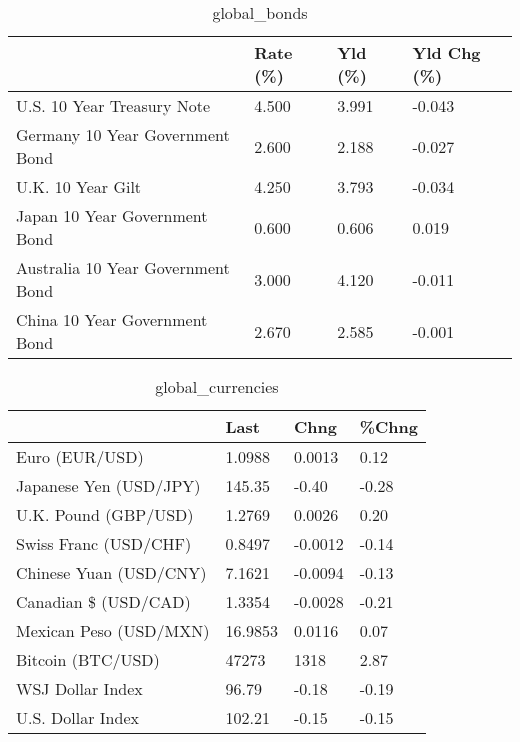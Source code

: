 \documentclass{article}%
\begin{document}
%


\begin{table}[htbp]%
\caption{global\_bonds}%
\centering%
\begin{adjustbox}{width=1\textwidth}%
\begin{tabular}{llll}
\toprule
                                  & Rate (\%) & Yld (\%) & Yld Chg (\%) \\
\midrule
       U.S. 10 Year Treasury Note &    4.500 &   3.991 &      -0.043 \\
  Germany 10 Year Government Bond &    2.600 &   2.188 &      -0.027 \\
                U.K. 10 Year Gilt &    4.250 &   3.793 &      -0.034 \\
    Japan 10 Year Government Bond &    0.600 &   0.606 &       0.019 \\
Australia 10 Year Government Bond &    3.000 &   4.120 &      -0.011 \\
    China 10 Year Government Bond &    2.670 &   2.585 &      -0.001 \\
\bottomrule
\end{tabular}
%
\end{adjustbox}%
\end{table}

%


\begin{table}[htbp]%
\caption{global\_currencies}%
\centering%
\begin{adjustbox}{width=1\textwidth}%
\begin{tabular}{llll}
\toprule
                       &    Last &    Chng & \%Chng \\
\midrule
        Euro (EUR/USD) &  1.0988 &  0.0013 &  0.12 \\
Japanese Yen (USD/JPY) &  145.35 &   -0.40 & -0.28 \\
  U.K. Pound (GBP/USD) &  1.2769 &  0.0026 &  0.20 \\
 Swiss Franc (USD/CHF) &  0.8497 & -0.0012 & -0.14 \\
Chinese Yuan (USD/CNY) &  7.1621 & -0.0094 & -0.13 \\
  Canadian \$ (USD/CAD) &  1.3354 & -0.0028 & -0.21 \\
Mexican Peso (USD/MXN) & 16.9853 &  0.0116 &  0.07 \\
     Bitcoin (BTC/USD) &   47273 &    1318 &  2.87 \\
      WSJ Dollar Index &   96.79 &   -0.18 & -0.19 \\
     U.S. Dollar Index &  102.21 &   -0.15 & -0.15 \\
\bottomrule
\end{tabular}
%
\end{adjustbox}%
\end{table}
\end{document}
